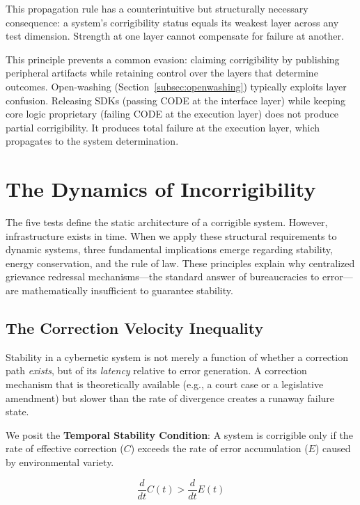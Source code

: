 \documentclass{article}
\begin{document}
This propagation rule has a counterintuitive but structurally necessary consequence: a system's corrigibility status equals its weakest layer across any test dimension. Strength at one layer cannot compensate for failure at another.

This principle prevents a common evasion: claiming corrigibility by publishing peripheral artifacts while retaining control over the layers that determine outcomes. Open-washing (Section~\ref{subsec:openwashing}) typically exploits layer confusion. Releasing SDKs (passing CODE at the interface layer) while keeping core logic proprietary (failing CODE at the execution layer) does not produce partial corrigibility. It produces total failure at the execution layer, which propagates to the system determination.

\section{The Dynamics of Incorrigibility}
\label{sec:dynamics}

The five tests define the static architecture of a corrigible system. However, infrastructure exists in time. When we apply these structural requirements to dynamic systems, three fundamental implications emerge regarding stability, energy conservation, and the rule of law. These principles explain why centralized grievance redressal mechanisms---the standard answer of bureaucracies to error---are mathematically insufficient to guarantee stability.

\subsection{The Correction Velocity Inequality}
\label{subsec:velocity}

Stability in a cybernetic system is not merely a function of whether a correction path \textit{exists}, but of its \textit{latency} relative to error generation. A correction mechanism that is theoretically available (e.g., a court case or a legislative amendment) but slower than the rate of divergence creates a runaway failure state.

We posit the \textbf{Temporal Stability Condition}: A system is corrigible only if the rate of effective correction ($C$) exceeds the rate of error accumulation ($E$) caused by environmental variety.

\begin{equation}
\frac{d}{dt} C(t) > \frac{d}{dt} E(t)
\end{equation}
\end{document}
